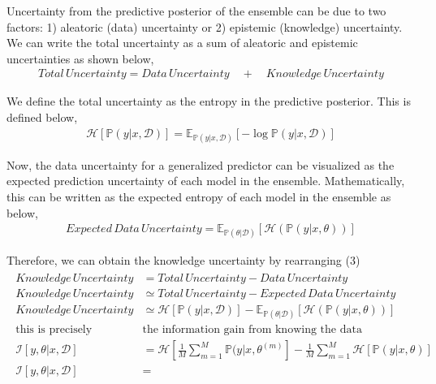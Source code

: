 \documentclass{article}
\begin{document}
Uncertainty from the predictive posterior of the ensemble can be due to two factors: 1) aleatoric (data) uncertainty or 2) epistemic (knowledge) uncertainty. We can write the total uncertainty as a sum of aleatoric and epistemic uncertainties as shown below,
\begin{align}
	Total \, Uncertainty = Data \, Uncertainty \quad + \quad Knowledge \, Uncertainty 
\end{align}

We define the total uncertainty as the entropy in the predictive posterior. This is defined below,
\begin{align}
	\mathcal{H} \left[ \mathbb{P}(y|x, \mathcal{D}) \right] = \mathbb{E}_{\mathbb{P}(y|x,\mathcal{D})} \left[ - \log{\mathbb{P}(y|x,\mathcal{D})} \right]
\end{align}

Now, the data uncertainty for a generalized predictor can be visualized as the expected prediction uncertainty of each model in the ensemble. Mathematically, this can be written as the expected entropy of each model in the ensemble as below,
\begin{align}
	Expected \, Data \, Uncertainty = \mathbb{E}_{\mathbb{P}(\theta|\mathcal{D})} \left[ \mathcal{H}(\mathbb{P}(y|x,\theta)) \right]
\end{align}

Therefore, we can obtain the knowledge uncertainty by rearranging (3)
\begin{align}
	\begin{split}
		Knowledge \, Uncertainty &= Total \, Uncertainty - Data \, Uncertainty\\
		Knowledge \, Uncertainty &\simeq Total \, Uncertainty - Expected \, Data \, Uncertainty\\
		Knowledge \, Uncertainty &\simeq \mathcal{H} \left[ \mathbb{P}(y|x, \mathcal{D}) \right] - \mathbb{E}_{\mathbb{P}(\theta|\mathcal{D})} \left[ \mathcal{H}(\mathbb{P}(y|x,\theta)) \right]\\
		\text{this is precisely } &\text{the information gain from knowing the data}\\
		\mathcal{I}\left[ y, \theta | x, \mathcal{D} \right] &= \mathcal{H} \left[ \frac{1}{M} \sum\limits_{m=1}^M \mathbb{P}(y|x,\theta^{(m)} \right] - \frac{1}{M} \sum\limits_{m=1}^M \mathcal{H}\left[ \mathbb{P}(y|x,\theta) \right] \\
		\mathcal{I}[y,\theta|x,\mathcal{D}] &= \\ 
	\end{split}
\end{align}
\end{document}
